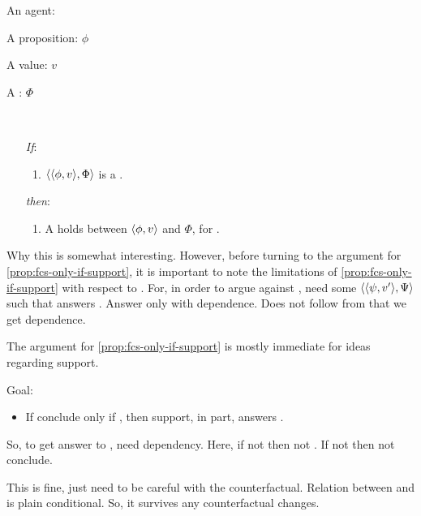 \begin{note}
  \begin{proposition}
    \label{prop:fcs-only-if-support}
    \begin{itemize*}[noitemsep, label=\(\circ\)]
    \item
      An agent: \vAgent{}
    \item
      A proposition: \(\phi\)
    \item
      A value: \(v\)
    \item
      A : \(\Phi\)
    \item
      \mbox{ }
    \end{itemize*}

    \begin{enumerate}
    \item[\emph{If}:]
      \begin{enumerate}[label=\alph*., ref=(\alph*.)]
      \item
        \(\langle \langle \phi, v \rangle, \Phi \rangle\) is a .
      \end{enumerate}
    \item[\emph{then}:]
      \begin{enumerate}[label=\alph*., ref=(\alph*.), resume]
      \item
        A  holds between \(\langle \phi, v \rangle\) and \(\Phi\), for \vAgent{}.
      \end{enumerate}
    \end{enumerate}
    \vspace{-\baselineskip}
  \end{proposition}

  {
    \color{red}
    Why this is somewhat interesting.
  }
  However, before turning to the argument for \autoref{prop:fcs-only-if-support}, it is important to note the limitations of \autoref{prop:fcs-only-if-support} with respect to \issueConstraint{}.
  For, in order to argue against \issueConstraint{}, need some \(\langle \langle \psi, v' \rangle, \Psi \rangle\) such that answers \qWhyV{}.
  Answer \qWhyV{} only with dependence.
  Does not follow from  that we get dependence.
\end{note}

\begin{note}
  The argument for \autoref{prop:fcs-only-if-support} is {\color{red} mostly immediate for ideas regarding support}.

  Goal:
  \begin{itemize}
  \item
    If conclude only if \fc{}, then support, in part, answers \qWhyV{}.
  \end{itemize}

  So, to get answer to \qWhyV{}, need dependency.
  Here, if not \support{} then not \fc{}.
  If not \fc{} then not conclude.

  This is fine, just need to be careful with the counterfactual.
  Relation between \support{} and \fc{} is plain conditional.
  So, it survives any counterfactual changes.
\end{note}

